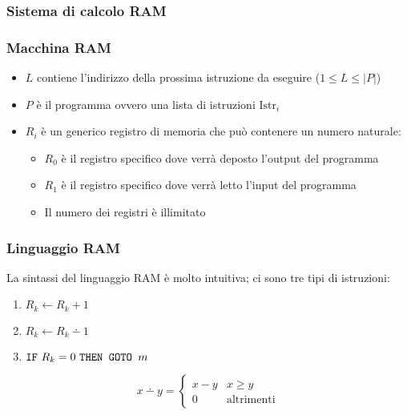 \subsubsection{Sistema di calcolo RAM}
\subsubsection*{Macchina RAM}
\begin{figure}[H]
    \centering
    
\end{figure}
\begin{itemize}
    \item $L$ contiene l'indirizzo della prossima istruzione da eseguire ($1\leq L\leq |P|$)
    \item $P$ è il programma ovvero una lista di istruzioni $\text{Istr}_i$
    \item $R_i$ è un generico registro di memoria che può contenere un numero naturale:
    \begin{itemize}
        \item $R_0$ è il registro specifico dove verrà deposto l'output del programma
        \item $R_1$ è il registro specifico dove verrà letto l'input del programma
        \item Il numero dei registri è illimitato
    \end{itemize}
\end{itemize}
\subsubsection*{Linguaggio RAM}
La sintassi del linguaggio RAM è molto intuitiva; ci sono tre tipi di istruzioni:

\begin{minipage}{.4\textwidth}
    \begin{enumerate}
        \itemsep.5em 
        \item $R_k \leftarrow R_k +1$ 
        \item $R_k \leftarrow R_k \dotminus 1$
        \item $\texttt{IF}\text{ $R_k=0$ }\texttt{THEN GOTO }\text{$m$}$
    \end{enumerate}
\end{minipage}
\begin{minipage}{.49\textwidth}
    $$x\dotminus y =\begin{cases}x-y&x\geq y\\ 0 &\text{altrimenti}\end{cases}$$
\end{minipage}

